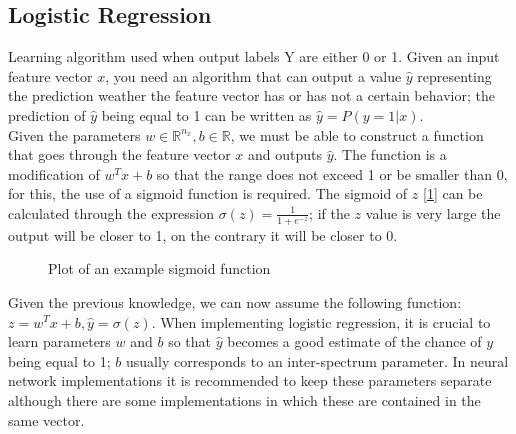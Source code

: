 \documentclass[11pt]{report}
\begin{document}
\subsection{Logistic Regression}
Learning algorithm used when output labels Y are either 0 or 1. Given an input feature vector $x$, you need an algorithm that can output a value $\hat{y}$ representing the prediction weather the feature vector has or has not a certain behavior; the prediction of $\hat{y}$ being equal to 1 can be written as $\hat{y} = P(y=1|x)$.\\
Given the parameters $w \in \mathbb{R}^{n_x}, b \in \mathbb{R}$, we must be able to construct a function that goes through the feature vector $x$ and outputs $\hat{y}$. The function is a modification of $w^Tx + b$ so that the range does not exceed 1 or be smaller than 0, for this, the use of a sigmoid function is required. The sigmoid of $z$ [\ref{fig:F2}] can be calculated through the expression $\sigma(z)=\frac{1}{1+e^{-z}}$; if the $z$ value is very large the output will be closer to 1, on the contrary it will be closer to 0.
\begin{figure}
	\centering
	\caption{Plot of an example sigmoid function} \label{fig:F2}
\end{figure}
Given the previous knowledge, we can now assume the following function: $z = w^Tx + b, \hat{y} = \sigma(z)$. When implementing logistic regression, it is crucial to learn parameters $w$ and $b$ so that $\hat{y}$ becomes a good estimate of the chance of $y$ being equal to 1; $b$ usually corresponds to an inter-spectrum parameter. In neural network implementations it is recommended to keep these parameters separate although there are some implementations in which these are contained in the same vector.
\newpage
\end{document}
